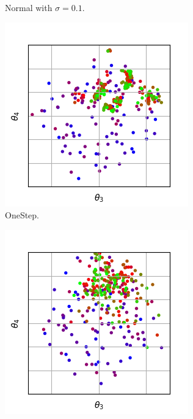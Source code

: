 \documentclass{llncs}
\begin{document}
\begin{figure}[t]
\begin{subfigure}[t]{0.24\textwidth}
        \caption{Normal with $\sigma=0.1$.}
        \label{subfig:mutation_normal_23}
    \end{subfigure}
    \begin{subfigure}[t]{0.24\textwidth}
        \centering
        \captionsetup{width=.9\textwidth}
        \includegraphics[width=\textwidth]{figures/mutation/simple_normal-100-10_none_onestep_2-3.png}
        \caption{OneStep.}
        \label{subfig:mutation_onestep_23}
    \end{subfigure}
    \begin{subfigure}[t]{0.24\textwidth}
        \centering
        \captionsetup{width=.9\textwidth}
        \includegraphics[width=\textwidth]{figures/mutation/simple_normal-100-10_none_nstep_2-3.png}

\end{subfigure}
\end{figure}
\end{document}
